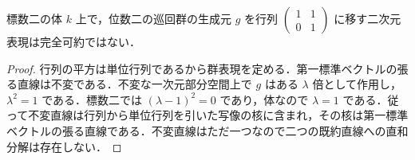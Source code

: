 \begin{example}[標数条件が必要となる例]
標数二の体 $k$ 上で，位数二の巡回群の生成元 $g$ を行列 $\begin{pmatrix}1&1\\0&1\end{pmatrix}$ に移す二次元表現は完全可約ではない．
\end{example}
\begin{proof}
行列の平方は単位行列であるから群表現を定める．第一標準ベクトルの張る直線は不変である．不変な一次元部分空間上で $g$ はある $\lambda$ 倍として作用し，$\lambda^2=1$ である．標数二では $(\lambda-1)^2=0$ であり，体なので $\lambda=1$ である．従って不変直線は行列から単位行列を引いた写像の核に含まれ，その核は第一標準ベクトルの張る直線である．不変直線はただ一つなので二つの既約直線への直和分解は存在しない．
\end{proof}
